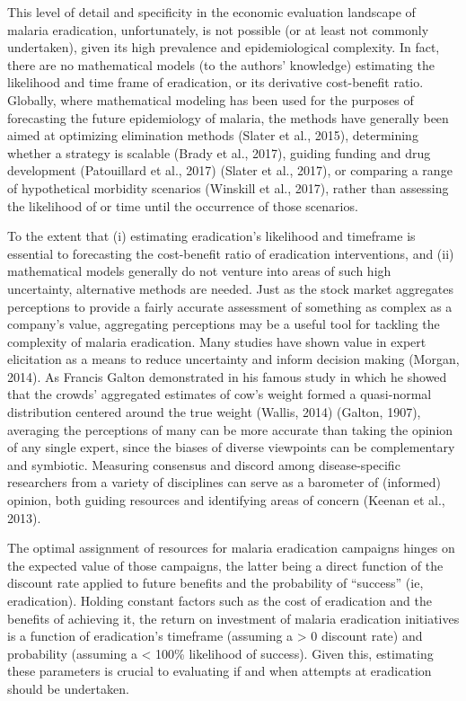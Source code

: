 \documentclass[]{article}
\begin{document}
This level of detail and specificity in the economic evaluation
landscape of malaria eradication, unfortunately, is not possible (or at
least not commonly undertaken), given its high prevalence and
epidemiological complexity. In fact, there are no mathematical models
(to the authors' knowledge) estimating the likelihood and time frame of
eradication, or its derivative cost-benefit ratio. Globally, where
mathematical modeling has been used for the purposes of forecasting the
future epidemiology of malaria, the methods have generally been aimed at
optimizing elimination methods (Slater et al., 2015), determining
whether a strategy is scalable (Brady et al., 2017), guiding funding and
drug development (Patouillard et al., 2017) (Slater et al., 2017), or
comparing a range of hypothetical morbidity scenarios (Winskill et al.,
2017), rather than assessing the likelihood of or time until the
occurrence of those scenarios.

To the extent that (i) estimating eradication's likelihood and timeframe
is essential to forecasting the cost-benefit ratio of eradication
interventions, and (ii) mathematical models generally do not venture
into areas of such high uncertainty, alternative methods are needed.
Just as the stock market aggregates perceptions to provide a fairly
accurate assessment of something as complex as a company's value,
aggregating perceptions may be a useful tool for tackling the complexity
of malaria eradication. Many studies have shown value in expert
elicitation as a means to reduce uncertainty and inform decision making
(Morgan, 2014). As Francis Galton demonstrated in his famous study in
which he showed that the crowds' aggregated estimates of cow's weight
formed a quasi-normal distribution centered around the true weight
(Wallis, 2014) (Galton, 1907), averaging the perceptions of many can be
more accurate than taking the opinion of any single expert, since the
biases of diverse viewpoints can be complementary and symbiotic.
Measuring consensus and discord among disease-specific researchers from
a variety of disciplines can serve as a barometer of (informed) opinion,
both guiding resources and identifying areas of concern (Keenan et al.,
2013).

The optimal assignment of resources for malaria eradication campaigns
hinges on the expected value of those campaigns, the latter being a
direct function of the discount rate applied to future benefits and the
probability of ``success'' (ie, eradication). Holding constant factors
such as the cost of eradication and the benefits of achieving it, the
return on investment of malaria eradication initiatives is a function of
eradication's timeframe (assuming a \textgreater{} 0 discount rate) and
probability (assuming a \textless{} 100\% likelihood of success). Given
this, estimating these parameters is crucial to evaluating if and when
attempts at eradication should be undertaken.
\end{document}
